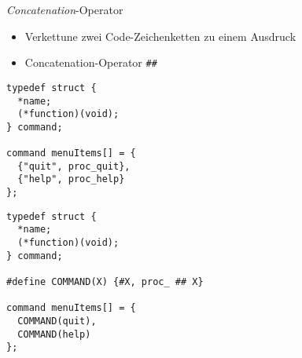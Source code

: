 
\begin{frame}[fragile]{\emph{Concatenation}-Operator}
%
\begin{itemize}
\item Verkettune zwei Code-Zeichenketten zu einem Ausdruck
\item Concatenation-Operator \texttt{\#\#}
\end{itemize}
%
%
\begin{codebox}
\begin{verbatim}
typedef struct {
  *name; 
  (*function)(void);
} command;

command menuItems[] = {
  {"quit", proc_quit},
  {"help", proc_help}
};
\end{verbatim}
\end{codebox}
%
\begin{codebox}
\begin{verbatim}
typedef struct {
  *name; 
  (*function)(void);
} command;

#define COMMAND(X) {#X, proc_ ## X}

command menuItems[] = {
  COMMAND(quit),
  COMMAND(help)
};
\end{verbatim}
\end{codebox}
%
\end{frame}



